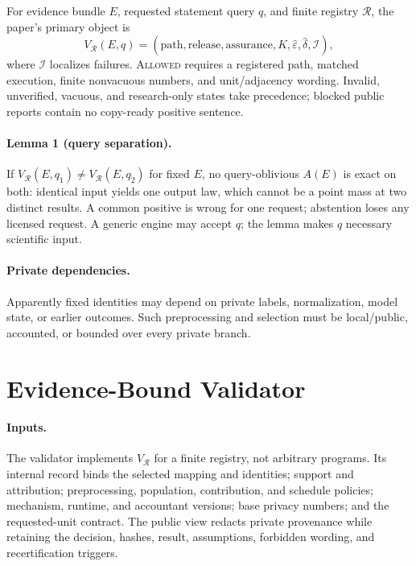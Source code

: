 \documentclass[letterpaper]{article} %
\newcommand{\Allowed}{\textsc{Allowed}}
\begin{document}
For evidence bundle $E$, requested statement query $q$, and finite registry
$\mathcal R$, the paper's primary object is
\[
V_{\mathcal R}(E,q)=(\text{path},\text{release},\text{assurance},
K,\widehat\varepsilon,\widehat\delta,\mathcal{I}),
\]
where $\mathcal I$ localizes failures. \Allowed{} requires a registered path, matched execution, finite nonvacuous numbers, and unit/adjacency wording. Invalid, unverified, vacuous, and research-only states take precedence; blocked public reports contain no copy-ready positive sentence.

\paragraph{Lemma 1 (query separation).}
If $V_{\mathcal R}(E,q_1)\ne V_{\mathcal R}(E,q_2)$ for fixed $E$, no query-oblivious $A(E)$ is exact on both: identical input yields one output law, which cannot be a point mass at two distinct results. A common positive is wrong for one request; abstention loses any licensed request. A generic engine may accept $q$; the lemma makes $q$ necessary scientific input.

\paragraph{Private dependencies.}
Apparently fixed identities may depend on private labels, normalization, model state, or earlier outcomes. Such preprocessing and selection must be local/public, accounted, or bounded over every private branch.

\section{Evidence-Bound Validator}

\paragraph{Inputs.}
The validator implements $V_{\mathcal R}$ for a finite registry, not arbitrary programs. Its internal record binds the selected mapping and identities; support and attribution; preprocessing, population, contribution, and schedule policies; mechanism, runtime, and accountant versions; base privacy numbers; and the requested-unit contract. The public view redacts private provenance while retaining the decision, hashes, result, assumptions, forbidden wording, and recertification triggers.
\end{document}
